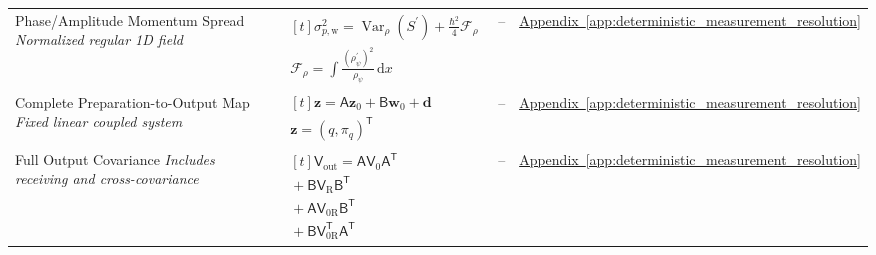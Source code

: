 \begin{longtable}{@{} p{4.5cm} p{6cm} c p{4cm} @{}}
{\raggedright Phase/Amplitude Momentum Spread \newline \textit{Normalized regular 1D field}\par} & {\raggedright $\begin{gathered}[t]\sigma_{p,\mathrm w}^2=\operatorname{Var}_\rho(S^{\prime})+\frac{\hbar^2}{4}\mathcal F_\rho \\ \mathcal F_\rho=\int\frac{(\rho_\psi^{\prime})^2}{\rho_\psi}\,\mathrm dx\end{gathered}$\par} & -- & {\raggedright \hyperref[app:deterministic_measurement_resolution]{Appendix~\ref*{app:deterministic_measurement_resolution}}\par} \\

{\raggedright Complete Preparation-to-Output Map \newline \textit{Fixed linear coupled system}\par} & {\raggedright $\begin{gathered}[t]\mathbf z=\mathsf A\mathbf z_0+\mathsf B\mathbf w_0+\mathbf d \\ \mathbf z=(q,\pi_q)^{\mathsf T}\end{gathered}$\par} & -- & {\raggedright \hyperref[app:deterministic_measurement_resolution]{Appendix~\ref*{app:deterministic_measurement_resolution}}\par} \\

{\raggedright Full Output Covariance \newline \textit{Includes receiving and cross-covariance}\par} & {\raggedright $\begin{gathered}[t]\mathsf V_{\mathrm{out}}=\mathsf A\mathsf V_0\mathsf A^{\mathsf T} \\ {}+\mathsf B\mathsf V_{\mathrm R}\mathsf B^{\mathsf T} \\ {}+\mathsf A\mathsf V_{0\mathrm R}\mathsf B^{\mathsf T} \\ {}+\mathsf B\mathsf V_{0\mathrm R}^{\mathsf T}\mathsf A^{\mathsf T}\end{gathered}$\par} & -- & {\raggedright \hyperref[app:deterministic_measurement_resolution]{Appendix~\ref*{app:deterministic_measurement_resolution}}\par} \\


\end{longtable}
